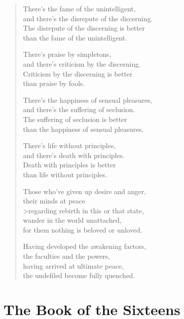 \documentclass[12pt,openany]{book}%
\let\oldcontentsline\contentsline
\newcommand{\nopagecontentsline}[3]{\oldcontentsline{#1}{#2}{}}
\begin{document}
\begin{verse}
There’s the fame of the unintelligent, \\
and there’s the disrepute of the discerning. \\
The disrepute of the discerning is better \\
than the fame of the unintelligent. 

There’s praise by simpletons, \\
and there’s criticism by the discerning. \\
Criticism by the discerning is better \\
than praise by fools. 

There’s the happiness of sensual pleasures, \\
and there’s the suffering of seclusion. \\
The suffering of seclusion is better \\
than the happiness of sensual pleasures. 

There’s life without principles, \\
and there’s death with principles. \\
Death with principles is better \\
than life without principles. 

Those who’ve given up desire and anger, \\
their minds at peace \\>regarding rebirth in this or that state, \\
wander in the world unattached, \\
for them nothing is beloved or unloved. 

Having developed the awakening factors, \\
the faculties and the powers, \\
having arrived at ultimate peace, \\
the undefiled become fully quenched. 

%
\end{verse}

%
\part*{The Book of the Sixteens }
\markboth{}{}
\addtocontents{toc}{\let\protect\contentsline\protect\oldcontentsline}
\end{document}
